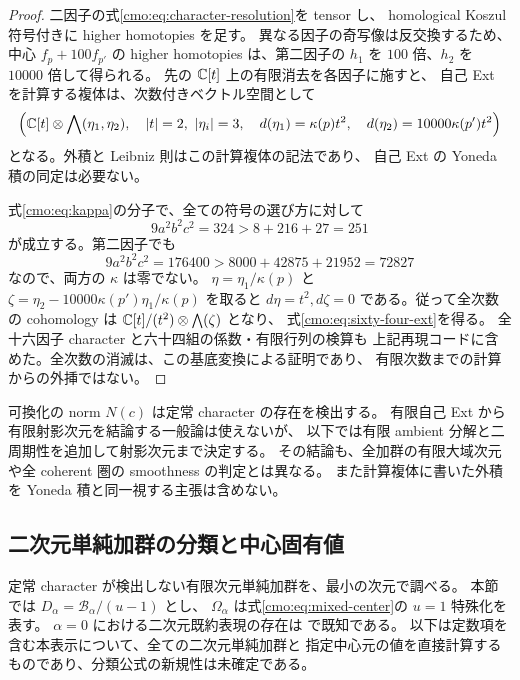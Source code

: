 \begin{proof}
二因子の式\eqref{cmo:eq:character-resolution}を tensor し、
homological Koszul 符号付きに higher homotopies を足す。
異なる因子の奇写像は反交換するため、
中心 $f_p+100f_{p'}$ の higher homotopies は、第二因子の
$h_1$ を $100$ 倍、$h_2$ を $10000$ 倍して得られる。
先の $\mathbb C[t]$ 上の有限消去を各因子に施すと、
自己 Ext を計算する複体は、次数付きベクトル空間として
\begin{equation}\label{cmo:eq:two-character-complex}
 \left(\mathbb C[t]\otimes\bigwedge(\eta_1,\eta_2),\quad
 |t|=2,\ |\eta_i|=3,\quad
 d(\eta_1)=\kappa(p)t^2,\quad
 d(\eta_2)=10000\kappa(p')t^2\right)
\end{equation}
となる。外積と Leibniz 則はこの計算複体の記法であり、
自己 Ext の Yoneda 積の同定は必要ない。

式\eqref{cmo:eq:kappa}の分子で、全ての符号の選び方に対して
\[
 9a^2b^2c^2=324>8+216+27=251
\]
が成立する。第二因子でも
\[
 9a^2b^2c^2=176400>8000+42875+21952=72827
\]
なので、両方の $\kappa$ は零でない。
$\eta=\eta_1/\kappa(p)$ と
$\zeta=\eta_2-10000\kappa(p')\eta_1/\kappa(p)$ を取ると
$d\eta=t^2,d\zeta=0$ である。従って全次数の cohomology は
$\mathbb C[t]/(t^2)\otimes\bigwedge(\zeta)$ となり、
式\eqref{cmo:eq:sixty-four-ext}を得る。
全十六因子 character と六十四組の係数・有限行列の検算も
上記再現コードに含めた。全次数の消滅は、この基底変換による証明であり、
有限次数までの計算からの外挿ではない。
\end{proof}

\begin{remark}
\label{cmo:rem:self-ext-scope}
可換化の norm $N(c)$ は定常 character の存在を検出する。
有限自己 Ext から有限射影次元を結論する一般論は使えないが、
以下では有限 ambient 分解と二周期性を追加して射影次元まで決定する。
その結論も、全加群の有限大域次元や全 coherent 圏の smoothness の判定とは異なる。
また計算複体に書いた外積を Yoneda 積と同一視する主張は含めない。
\end{remark}

\subsection{二次元単純加群の分類と中心固有値}
\label{cmo:subsec:two-dimensional}

定常 character が検出しない有限次元単純加群を、最小の次元で調べる。
本節では $D_\alpha=\mathcal B_\alpha/(u-1)$ とし、
$\Omega_\alpha$ は式\eqref{cmo:eq:mixed-center}の $u=1$ 特殊化を表す。
$\alpha=0$ における二次元既約表現の存在は
\cite[Proposition~4.1]{CMOWaltonRepresentations}で既知である。
以下は定数項を含む本表示について、全ての二次元単純加群と
指定中心元の値を直接計算するものであり、分類公式の新規性は未確定である。

